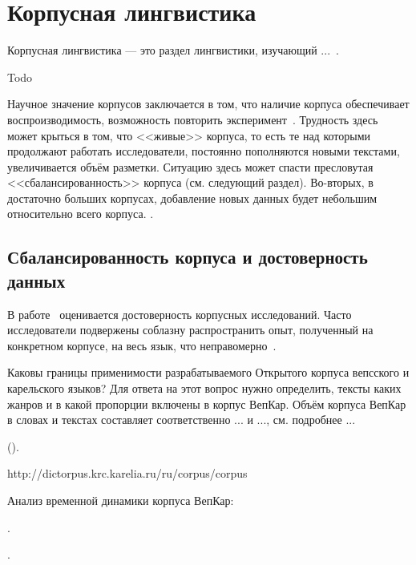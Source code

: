 \section{Корпусная лингвистика} \label{sect_review_corpus_linguistics}

Корпусная лингвистика --- это раздел лингвистики, изучающий ...~\cite{Zakharov2005}.

Todo

Научное значение корпусов заключается в том, что наличие корпуса обеспечивает воспроизводимость, возможность повторить эксперимент~\cite[с.~409]{Kibrik2019}. Трудность здесь может крыться в том, что <<живые>> корпуса, то есть те над которыми продолжают работать исследователи, постоянно пополняются новыми текстами, увеличивается объём разметки. Ситуацию здесь может спасти пресловутая <<сбалансированность>> корпуса (см. следующий раздел). 
Во-вторых, в достаточно больших корпусах, добавление новых данных будет небольшим относительно всего корпуса. . 

\subsection{Сбалансированность корпуса и достоверность данных}

В работе~\cite{Belikov2013}
оценивается достоверность корпусных исследований. 
Часто исследователи подвержены соблазну распространить опыт, полученный на конкретном корпусе, 
на весь язык, что неправомерно~\cite{Belikov2013}.

Каковы границы применимости разрабатываемого Открытого корпуса вепсского и карельского языков? 
Для ответа на этот вопрос нужно определить, тексты каких жанров и в какой пропорции включены в корпус ВепКар. 
Объём корпуса ВепКар в словах и текстах составляет соответственно ... и ..., см. подробнее ... 

().


http://dictorpus.krc.karelia.ru/ru/corpus/corpus

\bigskip

Анализ временной динамики корпуса ВепКар: 

.

.

